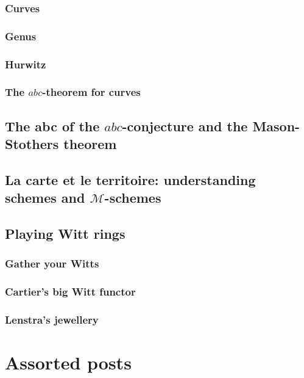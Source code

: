 \documentclass[a4paper]{memoir}
\begin{document}
\section{Curves}
\section{Genus}
\section{Hurwitz}
\section{The $abc$-theorem for curves}



\chapter{The abc of the $abc$-conjecture and the Mason-Stothers theorem}





\chapter{La carte et le territoire: understanding schemes and $\mathcal{M}$-schemes}








\chapter{Playing Witt rings}
\section{Gather your Witts}

\section{Cartier's big Witt functor}
\section{Lenstra's jewellery}






\part{Assorted posts}
\end{document}
